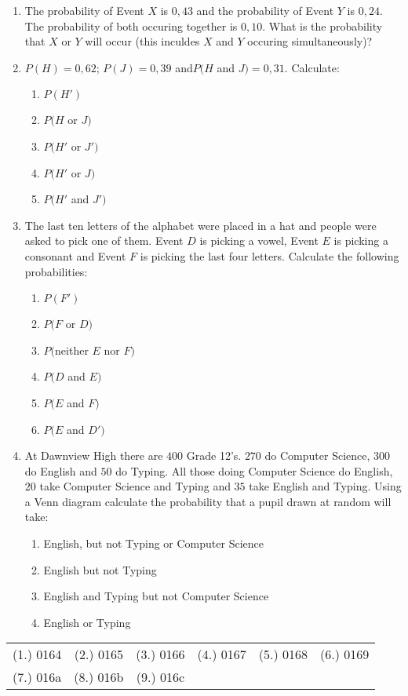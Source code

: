 \begin{eocexercises}{}
\begin{enumerate}
\item The probability of Event $X$ is $0,43$ and the probability of Event $Y$ is $0,24$. The probability of both occuring together is $0,10$. What is the probability that $X$ or $Y$ will occur (this inculdes $X$ and $Y$ occuring simultaneously)?  
\item$ P(H)=0,62$; $P(J)=0,39$ and$ P(H$ and $J)=0,31$. Calculate:
	\begin{enumerate}
	\item $P(H')$ 
	\item $P(H$ or $J)$
	\item $P(H'$ or $J')$
	\item $P(H'$ or $J)$
	\item $P(H'$ and $J')$
	\end{enumerate}
\item The last ten letters of the alphabet were placed in a hat and people were asked to pick one of them. Event $D$ is picking a vowel, Event $E$ is picking a consonant and Event $F$ is picking the last four letters. Calculate the following probabilities:
	\begin{enumerate}
	\item $P(F')$ 
	\item $P(F$ or $D)$
	\item $P($neither $E$ nor $F)$
	\item $P(D$ and $E)$
	\item $P(E$ and $F)$
	\item $P(E$ and $D')$
	\end{enumerate}
\item At Dawnview High there are $400$ Grade 12's. $270$ do Computer Science, $300$ do English and $50$ do Typing. All those doing Computer Science do English, $20$ take Computer Science and Typing and $35$ take English and Typing. Using a Venn diagram calculate the probability that a pupil drawn at random will take:
	\begin{enumerate}
	\item English, but not Typing or Computer Science 
	\item English but not Typing
	\item English and Typing but not Computer Science
	\item English or Typing
	\end{enumerate}   
\end{enumerate}


\par \practiceinfo
\par \begin{tabular}[h]{cccccc}
(1.)	0164	&
(2.)	0165	&
(3.)	0166	&
(4.)	0167	&
(5.)	0168	&
(6.)	0169	\\ %
(7.)	016a	&
(8.)	016b	&
(9.)	016c	&
\end{tabular}
\end{eocexercises} 








\appendix
